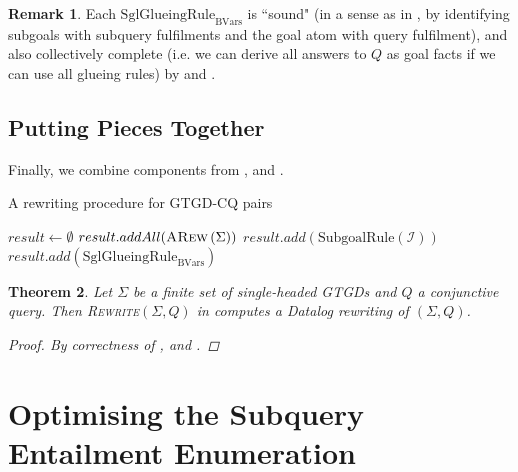 \documentclass[12pt]{report}
\theoremstyle{plain}
\newtheorem{theorem}{Theorem}[chapter]
\theoremstyle{definition}
\newtheorem{remark}[theorem]{Remark}
\def\FV{{\mathrm{FV}}}
\def\Vars{{\mathrm{Vars}}}
\newcommand{\ARew}[1]{\ensuremath{\normalfont{\textsc{ARew}} \left( #1 \right)}}
\begin{document}
\begin{remark}
\label{glueing-rule-soundness-and-completeness}
  Each $\mathrm{SglGlueingRule}_\mathrm{BVars}$ is ``sound" (in a sense as in , by identifying subgoals with subquery fulfilments and the goal atom with query fulfilment), and also collectively complete (i.e. we can derive all answers to $Q$ as goal facts if we can use all glueing rules) by  and .
\end{remark}

\subsection{Putting Pieces Together}

Finally, we combine components from ,  and .

\begin{algorithm}
\caption{A rewriting procedure for GTGD-CQ pairs}
\label{gtgd-cq-rewriting-procedure}
\begin{algorithmic}[1]
  \State $result \gets \emptyset$
  \State $result.addAll(\ARew{\Sigma})$
    \State $result.add(\mathrm{SubgoalRule}(\mathcal{I}))$
  \EndFor
  \For{\textbf{each} $\FV(Q) \subseteq \mathrm{BVars} \subseteq \Vars(Q)$ }
    \State $result.add(\mathrm{SglGlueingRule}_{\mathrm{BVars}})$
  \EndFor
  \State {}
\EndProcedure
\end{algorithmic}
\end{algorithm}

\begin{theorem}
  Let $\Sigma$ be a finite set of single-headed GTGDs and $Q$ a conjunctive query. Then \textsc{Rewrite}$(\Sigma, Q)$ in  computes a Datalog rewriting of $(\Sigma, Q)$.
  \begin{proof}
    By correctness of ,  and .
  \end{proof}
\end{theorem}

\section{Optimising the Subquery Entailment Enumeration}
\label{secomputation-optimisations}
\end{document}
